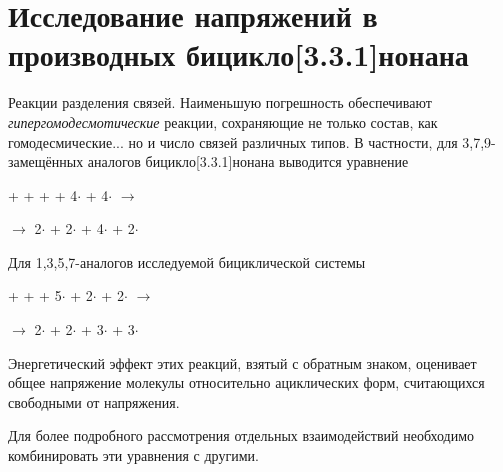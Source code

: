 \chapter{Исследование напряжений в производных бицикло[3.3.1]нонана}

Реакции разделения связей. Наименьшую погрешность обеспечивают \emph{гипергомодесмотические} реакции, сохраняющие не только состав, как гомодесмические... но и число связей различных типов. В частности, для 3,7,9-замещённых аналогов бицикло[3.3.1]нонана выводится уравнение
\begin{center}
  +  +  +  + 4\(\cdot\) 
  + 4\(\cdot\)
  \(\longrightarrow\)
  
  \(\longrightarrow\) 
  2\(\cdot\) + 2\(\cdot\) + 4\(\cdot\) + 
  2\(\cdot\)
\end{center}

Для 1,3,5,7-аналогов исследуемой бициклической системы
\begin{center}
  +  +  + 5\(\cdot\) 
  + 2\(\cdot\)
  + 2\(\cdot\)
  \(\longrightarrow\)
  
  \(\longrightarrow\) 
  2\(\cdot\) + 2\(\cdot\) + 3\(\cdot\) + 3\(\cdot\)
\end{center}

Энергетический эффект этих реакций, взятый с обратным знаком, оценивает общее напряжение молекулы относительно ациклических форм, считающихся свободными от напряжения. 

Для более подробного рассмотрения отдельных взаимодействий необходимо комбинировать эти уравнения с другими.

